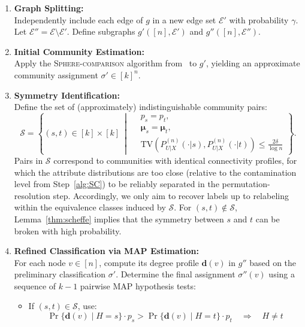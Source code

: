 \documentclass[11pt]{article}
\theoremstyle{plain}
\theoremstyle{definition}
\begin{document}
\begin{enumerate}
    \item \textbf{Graph Splitting:} \\
    Independently include each edge of \( g \) in a new edge set \( \mathcal{E}' \) with probability \( \gamma \). Let \( \mathcal{E}'' = \mathcal{E} \setminus \mathcal{E}' \). Define subgraphs \( g'([n], \mathcal{E}') \) and \( g''([n], \mathcal{E}'') \).
    
    \item \textbf{Initial Community Estimation:} \label{alg:SC} \\
    Apply the \textsc{Sphere-comparison} algorithm from~\citep{abbe015} to \( g' \), yielding an approximate community assignment \( \sigma' \in [k]^n \).
    
    
        \item \textbf{Symmetry Identification:} \\
    Define the set of (approximately) indistinguishable community pairs:
    \[
    \mathcal{S} = \left\{ (s,t) \in [k] \times [k]~\middle|~
    \begin{aligned}
        & p_s = p_t, \\
        & \bm{\mu}_s = \bm{\mu}_t, \\
        & \mathrm{TV}\left(P^{(n)}_{U|X}(\cdot|s), P^{(n)}_{U|X}(\cdot|t)\right) \le \frac{2\delta}{\log n}
    \end{aligned}
    \right\}.
    \]
    Pairs in $\mathcal{S}$ correspond to communities with identical connectivity profiles, for which the attribute distributions are too close (relative to the contamination level from Step~\ref{alg:SC}) to be reliably separated in the permutation-resolution step. Accordingly, we only aim to recover labels up to relabeling within the equivalence classes induced by $\mathcal{S}$. For $(s,t)\notin \mathcal{S}$, Lemma~\ref{thm:scheffe} implies that the symmetry between $s$ and $t$ can be broken with high probability.


    \item \textbf{Refined Classification via MAP Estimation:} \\
    For each node \( v \in [n] \), compute its degree profile \( \mathbf{d}(v) \) in \( g'' \) based on the preliminary classification \( \sigma' \). Determine the final assignment \( \sigma''(v) \) using a sequence of \( k-1 \) pairwise MAP hypothesis tests:
    
    \begin{itemize}
        \item If \( (s,t) \in \mathcal{S} \), use:
        \[
        \Pr\{ \mathbf{d}(v) \mid H = s \} \cdot p_s > \Pr\{ \mathbf{d}(v) \mid H = t \} \cdot p_t \quad \Rightarrow \quad H \neq t
        \]
        

\end{itemize}
\end{enumerate}
\end{document}
